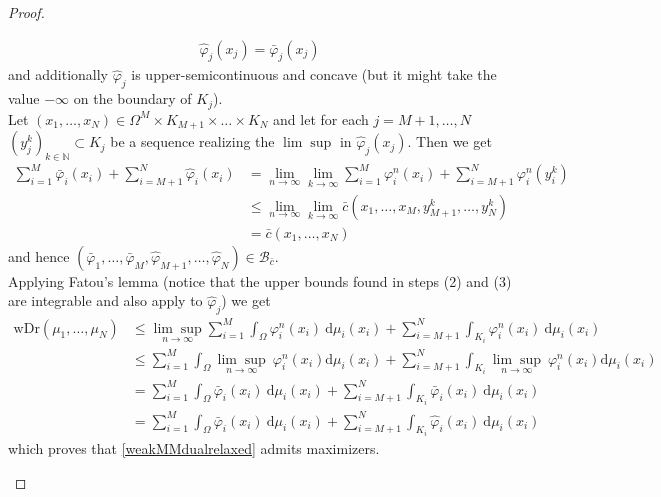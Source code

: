 \documentclass[10pt,a4paper]{amsart}
\newcommand{\NN}{\mathbb{N}}
\newcommand{\dd}{\mathrm{d}}
\begin{document}
\begin{proof}
\begin{enumerate}
\begin{gather*}
		\hat\varphi_j(x_j)=\bar\varphi_j(x_j)
	\end{gather*}
	and additionally $\hat\varphi_j$ is upper-semicontinuous and concave (but it might take the value $-\infty$ on the boundary of $K_j$).\\
	Let $(x_1,\dots,x_N)\in\Omega^M\times K_{M+1}\times\dots\times K_N$ and let for each $j=M+1,\dots,N$ $(y_j^k)_{k\in\NN}\subset K_j$ be a sequence realizing the $\lim\sup$ in $\hat\varphi_j(x_j)$.
	Then we get
	\begin{align*}
		\sum_{i=1}^M\bar\varphi_i(x_i)+\sum_{i=M+1}^N\hat\varphi_i(x_i)&=\lim_{n\rightarrow\infty}\lim_{k\rightarrow\infty}\sum_{i=1}^M\varphi_i^n(x_i)+\sum_{i=M+1}^N\varphi_i^n(y_i^k)\\
		&\leq \lim_{n\rightarrow\infty}\lim_{k\rightarrow\infty}\bar c(x_1,\dots,x_M,y_{M+1}^k,\dots,y_{N}^k)\\
		&=\bar c(x_1,\dots,x_N)
	\end{align*}
	and hence $(\bar\varphi_1,\dots,\bar\varphi_M,\hat\varphi_{M+1},\dots,\hat\varphi_{N})\in\mathcal B_{\bar c}$.\\
	Applying Fatou's lemma (notice that the upper bounds found in steps (2) and (3) are integrable and also apply to $\hat\varphi_j$) we get
	\begin{align*}
		\text{wDr}(\mu_1,\dots,\mu_N)
		&\leq\underset{n\rightarrow\infty}{\lim\sup}\sum_{i=1}^M\int_\Omega\varphi_i^n(x_i)\ \dd\mu_i(x_i)+\sum_{i=M+1}^N\int_{K_i}\varphi_i^n(x_i)\ \dd\mu_i(x_i)\\
		&\leq\sum_{i=1}^M\int_\Omega\underset{n\rightarrow\infty}{\lim\sup}\ \varphi_i^n(x_i) \dd\mu_i(x_i)+\sum_{i=M+1}^N\int_{K_i}\underset{n\rightarrow\infty}{\lim\sup}\ \varphi_i^n(x_i) \dd\mu_i(x_i)\\
		&=\sum_{i=1}^M\int_\Omega\bar\varphi_i(x_i)\ \dd\mu_i(x_i)+\sum_{i=M+1}^N\int_{K_i}\bar\varphi_i(x_i)\ \dd\mu_i(x_i)\\
		&=\sum_{i=1}^M\int_\Omega\bar\varphi_i(x_i)\ \dd\mu_i(x_i)+\sum_{i=M+1}^N\int_{K_i}\hat\varphi_i(x_i)\ \dd\mu_i(x_i)
	\end{align*}
	which proves that \eqref{weakMMdualrelaxed} admits maximizers.
	\end{enumerate}
\end{proof}
\end{document}
